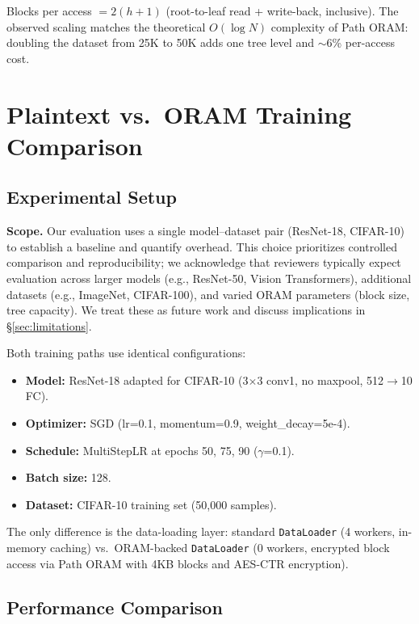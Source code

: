 \documentclass[11pt]{article}
\begin{document}
Blocks per access $= 2(h{+}1)$ (root-to-leaf read + write-back, inclusive). The observed scaling matches the theoretical $O(\log N)$ complexity of Path ORAM: doubling the dataset from 25K to 50K adds one tree level and $\sim$6\% per-access cost.

\section{Plaintext vs.\ ORAM Training Comparison}
\label{sec:comparison}

\subsection{Experimental Setup}

\textbf{Scope.}
Our evaluation uses a single model--dataset pair (ResNet-18, CIFAR-10) to establish a baseline and quantify overhead.
This choice prioritizes controlled comparison and reproducibility; we acknowledge that reviewers typically expect evaluation across larger models (e.g., ResNet-50, Vision Transformers), additional datasets (e.g., ImageNet, CIFAR-100), and varied ORAM parameters (block size, tree capacity).
We treat these as future work and discuss implications in \S\ref{sec:limitations}.

\medskip
\noindent Both training paths use identical configurations:
\begin{itemize}
    \item \textbf{Model:} ResNet-18 adapted for CIFAR-10 (3$\times$3 conv1, no maxpool, 512$\to$10 FC).
    \item \textbf{Optimizer:} SGD (lr=0.1, momentum=0.9, weight\_decay=5e-4).
    \item \textbf{Schedule:} MultiStepLR at epochs 50, 75, 90 ($\gamma$=0.1).
    \item \textbf{Batch size:} 128.
    \item \textbf{Dataset:} CIFAR-10 training set (50,000 samples).
\end{itemize}

The only difference is the data-loading layer: standard \texttt{DataLoader} (4 workers, in-memory caching) vs.\ ORAM-backed \texttt{DataLoader} (0 workers, encrypted block access via Path ORAM with 4KB blocks and AES-CTR encryption).

\subsection{Performance Comparison}
\end{document}
